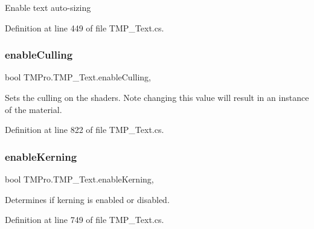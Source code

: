 Enable text auto-\/sizing 



Definition at line 449 of file T\+M\+P\+\_\+\+Text.\+cs.

\mbox{\label{class_t_m_pro_1_1_t_m_p___text_ae03e9f67ef0b2d504e508ec4505f78c7}} 
\subsubsection{\texorpdfstring{enableCulling}{enableCulling}}
{\footnotesize\ttfamily bool T\+M\+Pro.\+T\+M\+P\+\_\+\+Text.\+enable\+Culling\hspace{0.3cm}{\ttfamily [get]}, {\ttfamily [set]}}



Sets the culling on the shaders. Note changing this value will result in an instance of the material. 



Definition at line 822 of file T\+M\+P\+\_\+\+Text.\+cs.

\mbox{\label{class_t_m_pro_1_1_t_m_p___text_aa5ed53b59c07df2638065f155edc94c1}} 
\subsubsection{\texorpdfstring{enableKerning}{enableKerning}}
{\footnotesize\ttfamily bool T\+M\+Pro.\+T\+M\+P\+\_\+\+Text.\+enable\+Kerning\hspace{0.3cm}{\ttfamily [get]}, {\ttfamily [set]}}



Determines if kerning is enabled or disabled. 



Definition at line 749 of file T\+M\+P\+\_\+\+Text.\+cs.

\mbox{\label{class_t_m_pro_1_1_t_m_p___text_a5965d900f445c01580bb9bba25160959}} 

